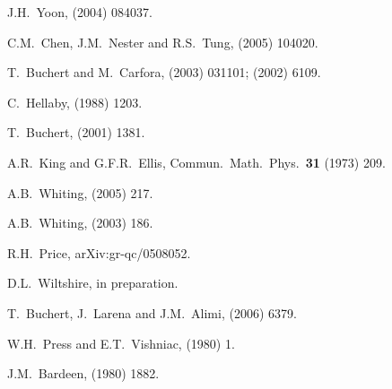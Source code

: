 \documentclass[12pt]{article}
\begin{document}
\begin{thebibliography}{66}
J.H.~Yoon,
 (2004) 084037.

C.M.~Chen, J.M.~Nester and R.S.~Tung,
 (2005) 104020. %

T.~Buchert and M.~Carfora,
 (2003) 031101; %
 (2002) 6109. %

C.~Hellaby,
 (1988) 1203.

T.~Buchert,
 (2001) 1381. %

A.R.~King and G.F.R.~Ellis,
Commun.\ Math.\ Phys.\ {\bf31} (1973) 209.

A.B.~Whiting,
 (2005) 217.

A.B.~Whiting,
 (2003) 186.

R.H.~Price,
arXiv:gr-qc/0508052.

D.L.~Wiltshire,
in preparation.

T.~Buchert, J.~Larena and J.M.~Alimi,
 (2006) 6379. %

W.H.~Press and E.T.~Vishniac,
 (1980) 1.

J.M.~Bardeen,
 (1980) 1882.


\end{thebibliography}
\end{document}
